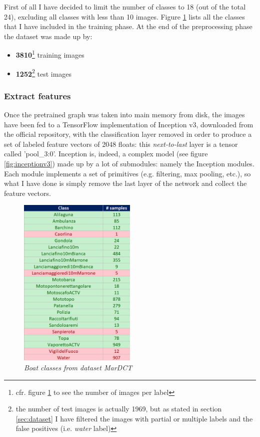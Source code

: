 \documentclass[12pt]{article}
\begin{document}
First of all I have decided to limit the number of classes to 18 (out of the total 24), excluding all classes with less than 10 images. Figure \ref{fig:labels} lists all the classes that I have included in the training phase. At the end of the preprocessing phase the dataset was made up by:
\begin{itemize}
	\item \textbf{3810}\footnote{cfr. figure \ref{fig:labels} to see the number of images per label} training images
	\item \textbf{1252}\footnote{the number of test images is actually 1969, but as stated in section \ref{sec:dataset} I have filtered the images with partial or multiple labels and the false positives (i.e. \textit{water} label)} test images
\end{itemize}

\subsubsection{Extract features}
Once the pretrained graph was taken into main memory from disk, the images have been fed to a TensorFlow implementation of Inception v3, downloaded from the official repository, with the classification layer removed in order to produce a set of labeled feature vectors of 2048 floats: this \textit{next-to-last} layer is a tensor called 'pool\_3:0'. Inception is, indeed, a complex model (see figure \ref{fig:inceptionv3}) made up by a lot of submodules: namely the Inception modules. Each module implements a set of primitives (e.g. filtering, max pooling, etc.), so what I have done is simply remove the last layer of the network and collect the feature vectors.
\begin{figure}[!hb]
	\centering %
	\includegraphics[width=0.5\textwidth]{labels.png} %
	\caption{\textit{Boat classes from dataset MarDCT}} %
	\label{fig:labels}
\end{figure}
\end{document}
